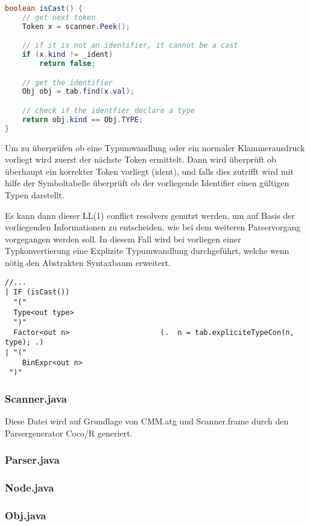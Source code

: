 \begin{lstlisting}[language=Java]
boolean isCast() {
	// get next token
	Token x = scanner.Peek();

	// if it is not an identifier, it cannot be a cast
	if (x.kind != _ident) 
		return false;

	// get the identifier
	Obj obj = tab.find(x.val);

	// check if the identfier declare a type
	return obj.kind == Obj.TYPE;
}
\end{lstlisting}

Um zu \"uberpr\"ufen ob eine Typumwandlung oder ein normaler Klammerausdruck vorliegt wird zuerst der n\"achste Token ermittelt. Dann wird \"uberpr\"uft ob \"uberhaupt ein korrekter Token vorliegt (ident), und falls dies zutrifft wird mit hilfe der Symboltabelle \"uberpr\"uft ob der vorliegende Identifier einen g\"ultigen Typen darstellt.

Es kann dann dieser LL(1) conflict resolvers genutzt werden, um auf Basis der vorliegenden Informationen zu entscheiden, wie bei dem weiteren Parservorgang vorgegangen werden soll. In diesem Fall wird bei vorliegen einer Typkonvertierung eine Explizite Typumwandlung durchgef\"uhrt, welche wenn n\"otig den Abstrakten Syntaxbaum erweitert.

\begin{lstlisting}[language=EBNF]
//...
| IF (isCast())                        
  "(" 
  Type<out type>
  ")"
  Factor<out n>                     (.  n = tab.expliciteTypeCon(n, type); .)
| "("
    BinExpr<out n>
 ")"
\end{lstlisting}

\subsubsection{Scanner.java}

Diese Datei wird auf Grundlage von CMM.atg und Scanner.frame durch den Parsergenerator Coco/R generiert. 

\subsubsection{Parser.java}

\subsubsection{Node.java}

\subsubsection{Obj.java}

